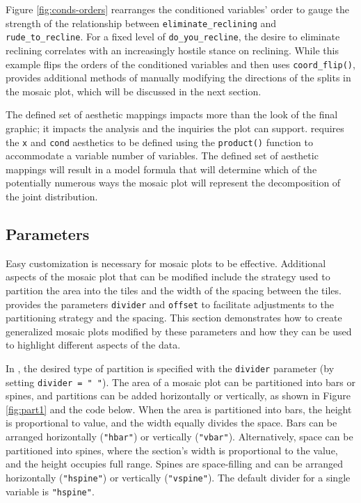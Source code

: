 Figure \ref{fig:conds-orders} rearranges the conditioned variables' order to gauge the strength of the relationship between \texttt{eliminate\_reclining} and \texttt{rude\_to\_recline}. For a fixed level of \texttt{do\_you\_recline}, the desire to eliminate reclining correlates with an increasingly hostile stance on reclining. While this example flips the orders of the conditioned variables and then uses \texttt{coord\_flip()},  provides additional methods of manually modifying the directions of the splits in the mosaic plot, which will be discussed in the next section.

The defined set of aesthetic mappings impacts more than the look of the final graphic; it impacts the analysis and the inquiries the plot can support.  requires the \texttt{x} and \texttt{cond} aesthetics to be defined using the \texttt{product()} function to accommodate a variable number of variables. The defined set of aesthetic mappings will result in a model formula that will determine which of the potentially numerous ways the mosaic plot will represent the decomposition of the joint distribution.

\hypertarget{parameters}{%
\subsection{Parameters}\label{parameters}}

Easy customization is necessary for mosaic plots to be effective. Additional aspects of the mosaic plot that can be modified include the strategy used to partition the area into the tiles and the width of the spacing between the tiles.  provides the parameters \texttt{divider} and \texttt{offset} to facilitate adjustments to the partitioning strategy and the spacing. This section demonstrates how to create generalized mosaic plots modified by these parameters and how they can be used to highlight different aspects of the data.

In , the desired type of partition is specified with the \texttt{divider} parameter (by setting \texttt{divider\ =\ "\ "}). The area of a mosaic plot can be partitioned into bars or spines, and partitions can be added horizontally or vertically, as shown in Figure \ref{fig:part1} and the code below. When the area is partitioned into bars, the height is proportional to value, and the width equally divides the space. Bars can be arranged horizontally (\texttt{"hbar"}) or vertically (\texttt{"vbar"}). Alternatively, space can be partitioned into spines, where the section's width is proportional to the value, and the height occupies full range. Spines are space-filling and can be arranged horizontally (\texttt{"hspine"}) or vertically (\texttt{"vspine"}). The default divider for a single variable is \texttt{"hspine"}.

